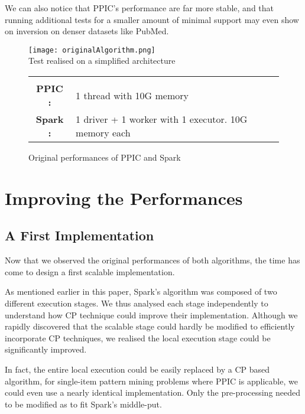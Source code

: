 \documentclass{eplmastersthesis}
\newcommand\danger{%
 \makebox[1.4em][c]{%
 \makebox[0pt][c]{\raisebox{.1em}{\small!}}%
 \makebox[0pt][c]{\color{red}\Large$\bigtriangleup$}}}%
\begin{document}
We can also notice that PPIC's performance are far more stable, and that running additional tests for a smaller amount of minimal support may even show on inversion on denser datasets like PubMed.\newline

\begin{figure}[h]
  \centering
  \texttt{[image: originalAlgorithm.png]} \\
  \danger  Test realised on a simplified architecture \danger \\
  \begin{tabular}{c l}
  	 & \\
  	\textbf{PPIC :} & 1 thread  with 10G memory \\
  	\textbf{Spark :} & 1 driver + 1 worker with 1 executor. 10G memory each
  \end{tabular}
  \caption{Original performances of PPIC and Spark}
  \label{fig:originalAlgorithmPerformances}
\end{figure}

\section{Improving the Performances}

\subsection{A First Implementation}

Now that we observed the original performances of both algorithms, the time has come to design a first scalable implementation. \newline

As mentioned earlier in this paper, Spark's algorithm was composed of two different execution stages. We thus analysed each stage independently to understand how CP technique could improve their implementation. Although we rapidly discovered that the scalable stage could hardly be modified to efficiently incorporate CP techniques, we realised the local execution stage could be significantly improved. \newline

In fact, the entire local execution could be easily replaced by a CP based algorithm, for single-item pattern mining problems where PPIC is applicable, we could even use a nearly identical implementation. Only the pre-processing needed to be modified as to fit Spark's middle-put. \newline
\end{document}
